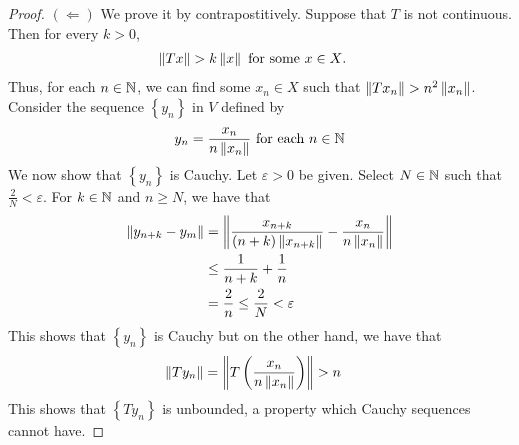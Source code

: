 \begin{proof}
    $\left( \Longleftarrow \right)$ We prove it by contrapostitively. Suppose that $T$ is not continuous. Then for every $k > 0$,
    \begin{align*}
	\left\lVert Tx \right\rVert &> k \left\lVert x \right\rVert \text{ for some } x \in X\text{.}
    \end{align*}
    Thus, for each $n\in \mathbb N$, we can find some $x_{n} \in X$ such that $\left\lVert Tx_{n} \right\rVert > n^{2} \left\lVert x_{n} \right\rVert$. Consider the sequence $\left\{ y_{n} \right\}$ in $V$ defined by 
    \begin{align*}
	y_{n} = \frac{x_{n}}{n\left\lVert x_{n} \right\rVert} \text{ for each } n \in \mathbb N
    \end{align*}
    We now show that $\left\{ y_{n} \right\}$ is Cauchy. Let $\varepsilon > 0$ be given. Select $N \in \mathbb N$ such that $\frac{2}{N}<\varepsilon$. For $k \in \mathbb N$ and $n\ge N$, we have that
    \begin{align*}
    \left\lVert y_{n+k} - y_{m} \right\rVert &= \left\lVert \frac{x_{n+k}}{(n+k)\left\lVert x_{n+k} \right\rVert}-  \frac{x_{n}}{n\left\lVert x_{n} \right\rVert} \right\rVert \\
    &\le \frac{1}{n+k} + \frac{1}{n} \\
    &= \frac{2}{n} \le \frac{2}{N} < \varepsilon
    \end{align*}
    This shows that $\left\{ y_{n} \right\}$ is Cauchy but on the other hand, we have that
    \begin{align*}
	\left\lVert Ty_{n} \right\rVert &= \left\lVert T\left( \frac{x_{n}}{n\left\lVert x_{n} \right\rVert} \right) \right\rVert >n
    \end{align*}
    This shows that $\left\{ Ty_{n} \right\}$ is unbounded, a property which Cauchy sequences cannot have.
\end{proof}
